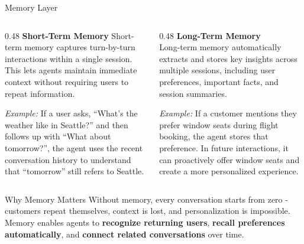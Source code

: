 \begin{frame}{Memory Layer}

\begin{columns}[T]
\begin{column}{0.48\textwidth}
\textbf{Short-Term Memory}
Short-term memory captures turn-by-turn interactions within a single session. This lets agents maintain immediate context without requiring users to repeat information.

\vspace{0.3em}
\textit{Example:} If a user asks, ``What's the weather like in Seattle?'' and then follows up with ``What about tomorrow?'', the agent uses the recent conversation history to understand that ``tomorrow'' still refers to Seattle.
\end{column}
\begin{column}{0.48\textwidth}
\textbf{Long-Term Memory}\\[0.3em]
Long-term memory automatically extracts and stores key insights across multiple sessions, including user preferences, important facts, and session summaries.

\vspace{0.3em}
\textit{Example:} If a customer mentions they prefer window seats during flight booking, the agent stores that preference. In future interactions, it can proactively offer window seats and create a more personalized experience.
\end{column}
\end{columns}

\vspace{0.5em}
\begin{block}{Why Memory Matters}
Without memory, every conversation starts from zero - customers repeat themselves, context is lost, and personalization is impossible. Memory enables agents to \textbf{recognize returning users}, \textbf{recall preferences automatically}, and \textbf{connect related conversations} over time.
\end{block}
\end{frame}


